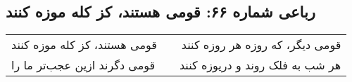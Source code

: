 \begin{center}
\section*{رباعی شماره ۶۶: قومی هستند، کز کله موزه کنند}
\label{sec:066}
\begin{longtable}{l p{0.5cm} r}
قومی هستند، کز کله موزه کنند
&&
قومی دیگر، که روزه هر روزه کنند
\\
قومی دگرند ازین عجب‌تر ما را
&&
هر شب به فلک روند و دریوزه کنند
\\
\end{longtable}
\end{center}
